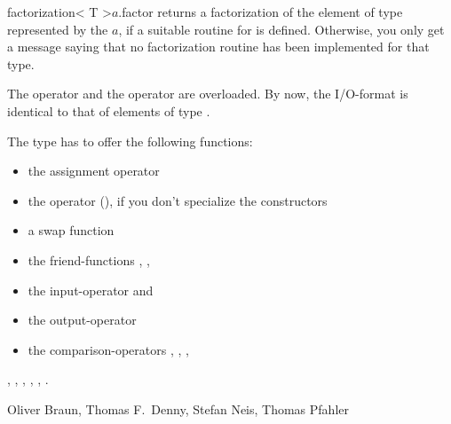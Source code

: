\begin{fcode}{factorization< T >}{$a$.factor}{}
  returns a factorization of the element of type  represented by the
   $a$, if a suitable routine for  is defined.
  Otherwise, you only get a message saying that no factorization routine has been implemented
  for that type.
\end{fcode}



\IO

The  operator \code{>>} and the  operator\code{<<} are
overloaded.  By now, the I/O-format is identical to that of elements of type .



\NOTES

The type  has to offer the following functions:
\begin{itemize}
\item the assignment operator \code{=}
\item the operator \code{=} (), if you don't specialize the constructors
\item a swap function 
\item the friend-functions , , 
\item the input-operator \code{>>} and
\item the output-operator \code{<<}
\item the comparison-operators \code{<}, \code{<=}, \code{==}, \code{!=}
\end{itemize}



\SEEALSO

,
, ,
,
, .



\AUTHOR
Oliver Braun, Thomas F.~Denny,
Stefan Neis, Thomas Pfahler
